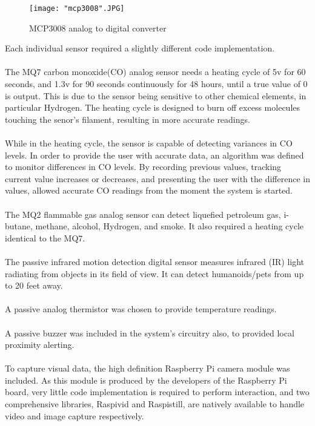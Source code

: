 \documentclass{article}
\begin{document}
\begin{figure}[H]
\centering
\texttt{[image: "mcp3008".JPG]}
\caption{MCP3008 analog to digital converter}
\label{fig:hard_adc}
\end{figure}

Each individual sensor required a slightly different code implementation. \\\\
The MQ7 carbon monoxide(CO) analog sensor needs a heating cycle of 5v for 60 seconds, and 1.3v for 90 seconds continuously for 48 hours, until a true value of 0 is output. This is due to the sensor being sensitive to other chemical elements, in particular Hydrogen. The heating cycle is designed to burn off excess molecules touching the senor\rq s filament, resulting in more accurate readings. \\\\ While in the heating cycle, the sensor is capable of detecting variances in CO levels. In order to provide the user with accurate data, an algorithm was defined to monitor differences in CO levels. By recording previous values, tracking current value increases or decreases, and presenting the user with the difference in values, allowed accurate CO readings from the moment the system is started. \\\\
The MQ2 flammable gas analog sensor can detect liquefied petroleum gas, i-butane, methane, alcohol, Hydrogen, and smoke. It also required a heating cycle identical to the MQ7. \\\\
The passive infrared motion detection digital sensor measures infrared (IR) light radiating from objects in its field of view. It can detect humanoids/pets from up to 20 feet away. \\\\
A passive analog thermistor was chosen to provide temperature readings. \\\\
A passive buzzer was included in the system’s circuitry also, to provided local proximity alerting. \\\\
To capture visual data, the high definition Raspberry Pi camera module was included. As this module is produced by the developers of the Raspberry Pi board, very little code implementation is required to perform interaction, and two comprehensive libraries, Raspivid and Raspistill,  are natively available to handle video and image capture respectively.
\end{document}
